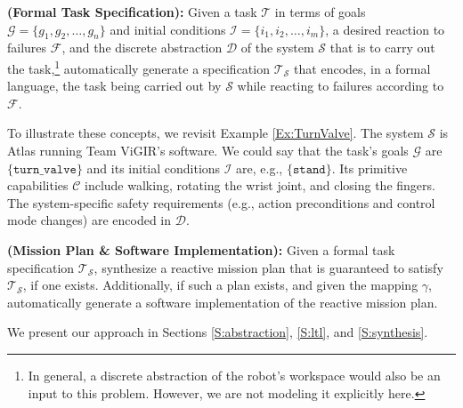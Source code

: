 \begin{myProblem}\label{SpecificationProblem}
\textbf{(Formal Task Specification):}
Given a task $\mathcal{T}$ in terms of goals $\mathcal{G} = \{ g_1, g_2, \ldots, g_n \}$ and initial conditions $\mathcal{I} = \{ i_1, i_2, \ldots, i_m \}$,
a desired reaction to failures $\mathcal{F}$,
and the discrete abstraction $\mathcal{D}$ of the system $\mathcal{S}$ that is to carry out the task,\footnote{In general, a discrete abstraction of the robot's workspace would also be an input to this problem. However, we are not modeling it explicitly here.}
 automatically generate a specification $\mathcal{T}_\mathcal{S}$ that encodes, in a formal language, the task being carried out by $\mathcal{S}$ while reacting to failures according to $\mathcal{F}$.
\end{myProblem}

To illustrate these concepts, we revisit Example \ref{Ex:TurnValve}. 
The system $\mathcal{S}$ is Atlas running Team ViGIR's software.
We could say that the task's goals $\mathcal{G}$ are $\{ \mathtt{turn\_valve} \}$ and its initial conditions $\mathcal{I}$ are, e.g., $\{ \mathtt{stand} \}$.
Its primitive capabilities $\mathcal{C}$ include walking, rotating the wrist joint, and closing the fingers.
The system-specific safety requirements (e.g., action preconditions and control mode changes) are encoded in $\mathcal{D}$.

\begin{myProblem}\label{BehaviorSynthesisProblem}
\textbf{(Mission Plan \& Software Implementation):}
Given a formal task specification $\mathcal{T}_\mathcal{S}$, synthesize a reactive mission plan that is guaranteed to satisfy $\mathcal{T}_\mathcal{S}$, if one exists.
Additionally, if such a plan exists, and given the mapping $\gamma$, automatically generate a software implementation of the reactive mission plan. 
\end{myProblem}

We present our approach in Sections \ref{S:abstraction}, \ref{S:ltl}, and \ref{S:synthesis}.

